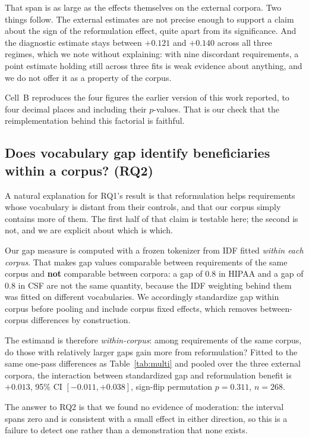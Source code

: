\documentclass[a4paper,fleqn]{cas-sc}
\begin{document}
That span is as large as the effects themselves on the external corpora. Two things follow. The external estimates are not precise enough to support a claim about the sign of the reformulation effect, quite apart from its significance. And the diagnostic estimate stays between $+0.121$ and $+0.140$ across all three regimes, which we note without explaining: with nine discordant requirements, a point estimate holding still across three fits is weak evidence about anything, and we do not offer it as a property of the corpus.

Cell~B reproduces the four figures the earlier version of this work reported, to four decimal places and including their $p$-values. That is our check that the reimplementation behind this factorial is faithful.

\subsection{Does vocabulary gap identify beneficiaries within a corpus? (RQ2)}
\label{sec:results-gap}

A natural explanation for RQ1's result is that reformulation helps requirements whose vocabulary is distant from their controls, and that our corpus simply contains more of them. The first half of that claim is testable here; the second is not, and we are explicit about which is which.

Our gap measure is computed with a frozen tokenizer from IDF fitted \emph{within each corpus}. That makes gap values comparable between requirements of the same corpus and \textbf{not} comparable between corpora: a gap of $0.8$ in HIPAA and a gap of $0.8$ in CSF are not the same quantity, because the IDF weighting behind them was fitted on different vocabularies. We accordingly standardize gap within corpus before pooling and include corpus fixed effects, which removes between-corpus differences by construction.

The estimand is therefore \emph{within-corpus}: among requirements of the same corpus, do those with relatively larger gaps gain more from reformulation? Fitted to the same one-pass differences as Table~\ref{tab:multi} and pooled over the three external corpora, the interaction between standardized gap and reformulation benefit is $+0.013$, 95\% CI $[-0.011, +0.038]$, sign-flip permutation $p = 0.311$, $n = 268$.

The answer to RQ2 is that we found no evidence of moderation: the interval spans zero and is consistent with a small effect in either direction, so this is a failure to detect one rather than a demonstration that none exists.
\end{document}

